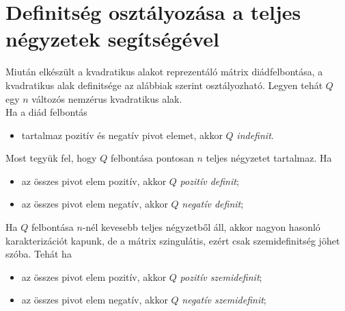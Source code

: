 \documentclass[a4paper, showtrims]{memoir}
\theoremstyle{plain}
\theoremstyle{remark}
\theoremstyle{definition}
\begin{document}
\section{Definitség osztályozása a teljes négyzetek segítségével}
Miután elkészült a kvadratikus alakot reprezentáló mátrix diádfelbontása,
a kvadratikus alak definitsége az alábbiak szerint osztályozható.
Legyen tehát $Q$ egy $n$ változós nemzérus kvadratikus alak.\\
Ha a diád felbontás
\begin{itemize}
    \item tartalmaz pozitív és negatív pivot elemet, 
        akkor $Q$ \emph{indefinit}.
\end{itemize}
Most tegyük fel, hogy $Q$ felbontása pontosan $n$ teljes négyzetet tartalmaz.
Ha
\begin{itemize}
    \item az összes pivot elem pozitív,
        akkor $Q$ \emph{pozitív definit};
    \item az összes pivot elem negatív,
        akkor $Q$ \emph{negatív definit};
\end{itemize}
Ha $Q$ felbontása $n$-nél kevesebb teljes négyzetből áll,
akkor nagyon hasonló karakterizációt kapunk, de a mátrix szingulátis, ezért csak szemidefinitség jöhet szóba.
Tehát ha
\begin{itemize}
\item az összes pivot elem pozitív,
    akkor $Q$ \emph{pozitív szemidefinit};
\item az összes pivot elem negatív,
    akkor $Q$ \emph{negatív szemidefinit};
\end{itemize}

\backmatter
\pagestyle{empty}
%
\printbibliography
\printindex
\end{document}
